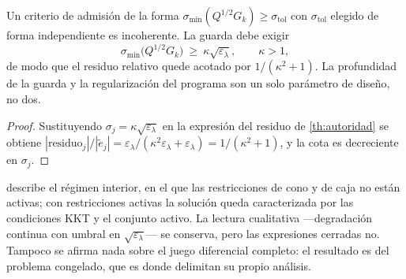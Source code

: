 \begin{corolario}
\label{co:guarda}
Un criterio de admisión de la forma $\sigma_{\min}(Q^{1/2}G_k)\ge\sigma_{\mathrm{tol}}$
con $\sigma_{\mathrm{tol}}$ elegido de forma independiente es incoherente. La
guarda debe exigir
\[
  \sigma_{\min}\bigl(Q^{1/2}G_k\bigr)\ \ge\ \kappa\sqrt{\varepsilon_\lambda},
  \qquad \kappa>1,
\]
de modo que el residuo relativo quede acotado por $1/(\kappa^{2}+1)$. La
profundidad de la guarda y la regularización del programa son un solo parámetro
de diseño, no dos.
\end{corolario}

\begin{proof}
Sustituyendo $\sigma_j=\kappa\sqrt{\varepsilon_\lambda}$ en la expresión del
residuo de \cref{th:autoridad} se obtiene
$|\text{residuo}_j|/|\tilde e_j|=\varepsilon_\lambda/(\kappa^{2}\varepsilon_\lambda+\varepsilon_\lambda)
=1/(\kappa^{2}+1)$, y la cota es decreciente en $\sigma_j$.
\end{proof}

\begin{observacion}[Alcance]
\label{obs:autoridad-alcance}
 describe el régimen interior, en el que las restricciones de
cono y de caja no están activas; con restricciones activas la solución queda
caracterizada por las condiciones KKT y el conjunto activo. La lectura cualitativa —degradación continua con umbral en
$\sqrt{\varepsilon_\lambda}$— se conserva, pero las expresiones cerradas no.
Tampoco se afirma nada sobre el juego diferencial completo: el resultado es del
problema congelado, que es donde \cite{glizer2022singular} delimitan su
propio análisis.
\end{observacion}
